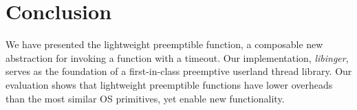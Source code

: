 \section{Conclusion}

We have presented the lightweight preemptible function, a composable new abstraction
for invoking a function with a timeout.  Our implementation, \textit{libinger},
serves as the foundation of
a first-in-class preemptive userland thread library.  Our evaluation shows that
lightweight
preemptible functions have lower overheads than the most similar OS primitives, yet
enable new functionality.
